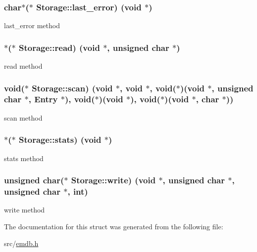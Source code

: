 \subsubsection[{last\+\_\+error}]{\setlength{\rightskip}{0pt plus 5cm}char$\ast$($\ast$ Storage\+::last\+\_\+error) (void $\ast$)}\label{struct_storage_a32909539bbc234d20b4bb0a51c575c9c}
last\+\_\+error method \hypertarget{struct_storage_a6f8774ce9a6598367d47eaeafaf245d4}{}
\subsubsection[{read}]{$\ast$($\ast$ Storage\+::read) (void $\ast$, unsigned char $\ast$)}\label{struct_storage_a6f8774ce9a6598367d47eaeafaf245d4}
read method \hypertarget{struct_storage_ae2c0ea6705b1e1b3518f97b60581a9e3}{}
\subsubsection[{scan}]{\setlength{\rightskip}{0pt plus 5cm}void($\ast$ Storage\+::scan) (void $\ast$, void $\ast$, void($\ast$)(void $\ast$, unsigned char $\ast$, {\bf Entry} $\ast$), void($\ast$)(void $\ast$), void($\ast$)(void $\ast$, char $\ast$))}\label{struct_storage_ae2c0ea6705b1e1b3518f97b60581a9e3}
scan method \hypertarget{struct_storage_a6642751e068c1e64f8b65703a8bc51a0}{}
\subsubsection[{stats}]{$\ast$($\ast$ Storage\+::stats) (void $\ast$)}\label{struct_storage_a6642751e068c1e64f8b65703a8bc51a0}
stats method \hypertarget{struct_storage_a277c5f5a2ec42f4b66e83a95fb2b679c}{}
\subsubsection[{write}]{\setlength{\rightskip}{0pt plus 5cm}unsigned char($\ast$ Storage\+::write) (void $\ast$, unsigned char $\ast$, unsigned char $\ast$, int)}\label{struct_storage_a277c5f5a2ec42f4b66e83a95fb2b679c}
write method 

The documentation for this struct was generated from the following file\+:\begin{DoxyCompactItemize}
\item 
src/\hyperlink{emdb_8h}{emdb.\+h}\end{DoxyCompactItemize}
